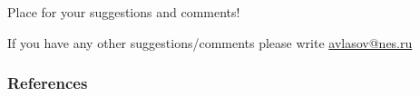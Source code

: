 \documentclass[11pt,pdf,aspectratio=129]{beamer}
\begin{document}
\begin{frame}

\begin{center}
    \Large Place for your suggestions and comments!
\end{center} 
\begin{center}
    \footnotesize
If you have any other suggestions/comments  please write \href{mailto://avlasov@nes.ru}{avlasov@nes.ru}
\end{center}


\end{frame}



\begin{frame}[t, allowframebreaks]
    \frametitle{References}
    
    
    \end{frame}
\end{document}
